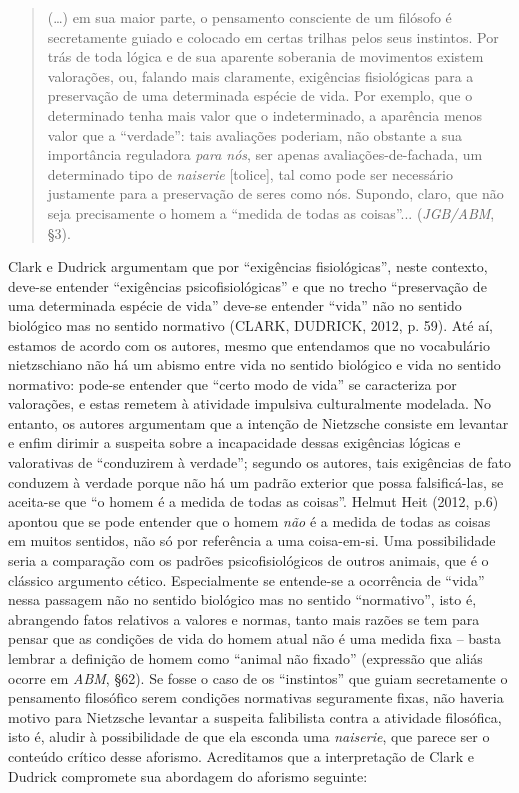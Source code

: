 \documentclass[
	12pt,				%
	openright,			%
	oneside,			%
	a4paper,			%
	english,			%
	french,				%
	spanish,			%
	brazil				%
	]{abntex2}
\begin{document}
\begin{quotation}
(…) em sua maior parte, o pensamento consciente de um filósofo é secretamente guiado e colocado em certas trilhas pelos seus instintos. Por trás de toda lógica e de sua aparente soberania de movimentos existem valorações, ou, falando mais claramente, exigências fisiológicas para a preservação de uma determinada espécie de vida. Por exemplo, que o determinado tenha mais valor que o indeterminado, a aparência menos valor que a “verdade”: tais avaliações poderiam, não obstante a sua importância reguladora \textit{para nós}, ser apenas avaliações-de-fachada, um determinado tipo de \textit{naiserie} [tolice], tal como pode ser necessário justamente para a preservação de seres como nós. Supondo, claro, que não seja precisamente o homem a “medida de todas as coisas”... (\textit{JGB/ABM}, §3).
\end{quotation}

Clark e Dudrick argumentam que por “exigências fisiológicas”, neste contexto, deve-se entender “exigências psicofisiológicas” e que no trecho “preservação de uma determinada espécie de vida” deve-se entender “vida” não no sentido biológico mas no sentido normativo (CLARK, DUDRICK, 2012, p. 59). Até aí, estamos de acordo com os autores, mesmo que entendamos que no vocabulário nietzschiano não há um abismo entre vida no sentido biológico e vida no sentido normativo: pode-se entender  que “certo modo de vida” se caracteriza por valorações, e estas remetem à atividade impulsiva culturalmente modelada. No entanto, os autores argumentam que a intenção de Nietzsche consiste em levantar e enfim dirimir a suspeita sobre a incapacidade dessas exigências lógicas e valorativas de “conduzirem à verdade”; segundo os autores, tais exigências de fato conduzem à verdade porque não há um padrão exterior que possa falsificá-las, se aceita-se que “o homem é a medida de todas as coisas”. Helmut Heit (2012, p.6) apontou que se pode entender que o homem \textit{não} é a medida de todas as coisas em muitos sentidos, não só por referência a uma coisa-em-si. Uma possibilidade seria a comparação com os padrões psicofisiológicos de outros animais, que é o clássico argumento cético. Especialmente se entende-se a ocorrência de “vida” nessa passagem não no sentido biológico mas no sentido “normativo”, isto é, abrangendo fatos relativos a valores e normas, tanto mais razões se tem para pensar que as condições de vida do homem atual não é uma medida fixa – basta lembrar a definição de homem como “animal não fixado” (expressão que aliás ocorre em \textit{ABM}, §62). Se fosse o caso de os “instintos” que guiam secretamente o pensamento filosófico serem condições normativas seguramente fixas, não haveria motivo para Nietzsche levantar a suspeita falibilista contra a atividade filosófica, isto é, aludir à possibilidade de que ela esconda uma \textit{naiserie}, que parece ser o conteúdo crítico desse aforismo. Acreditamos que a interpretação de Clark e Dudrick compromete sua abordagem do aforismo seguinte:
\end{document}
